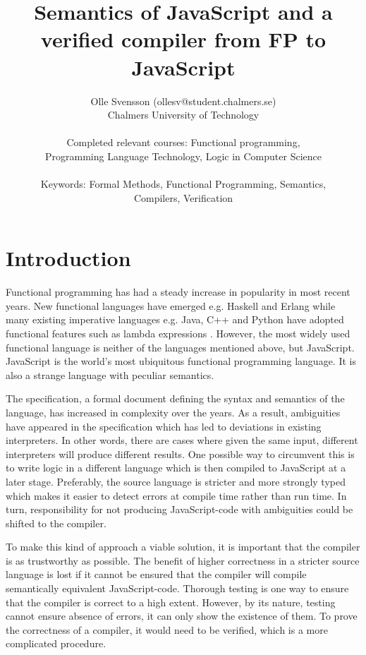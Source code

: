 \documentclass [11pt]{article}
\title{Semantics of JavaScript and a verified compiler from FP to JavaScript}
\author{Olle Svensson (ollesv@student.chalmers.se) \\
		Chalmers University of Technology \\ \\
		Completed relevant courses: Functional programming, \\
		Programming Language Technology, Logic in Computer Science \\ \\
		Keywords: Formal Methods, Functional Programming, Semantics, \\
		Compilers, Verification}
\begin{document}
\maketitle

\section{Introduction}
Functional programming has had a steady increase in popularity in most recent years. New functional languages have emerged e.g. Haskell and Erlang while many existing imperative languages e.g. Java, C++ and Python have adopted functional features such as lambda expressions \cite{how}. However, the most widely used functional language is neither of the languages mentioned above, but JavaScript. JavaScript is the world's most ubiquitous functional programming language. It is also a strange language with peculiar semantics. 

The specification, a formal document defining the syntax and semantics of the language, has increased in complexity over the years. As a result, ambiguities have appeared in the specification which has led to deviations in existing interpreters. In other words, there are cases where given the same input, different interpreters will produce different results. One possible way to circumvent this is to write logic in a different language which is then compiled to JavaScript at a later stage. Preferably, the source language is stricter and more strongly typed which makes it easier to detect errors at compile time rather than run time. In turn, responsibility for not producing JavaScript-code with ambiguities could be shifted to the compiler.

To make this kind of approach a viable solution, it is important that the compiler is as trustworthy as possible. The benefit of higher correctness in a stricter source language is lost if it cannot be ensured that the compiler will compile semantically equivalent JavaScript-code. Thorough testing is one way to ensure that the compiler is correct to a high extent. However, by its nature, testing cannot ensure absence of errors, it can only show the existence of them. To prove the correctness of a compiler, it would need to be verified, which is a more complicated procedure.
\end{document}
